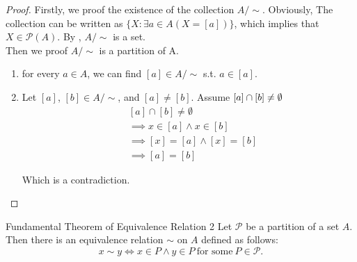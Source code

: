 \begin{proof}
    Firstly, we proof the existence of the collection $A/\sim$. Obviously, The collection can be written as $\{X: \exists a \in A (X = [a])\}$, which implies that $X \in \mathcal{P}(A) $. By , $A/\sim$ is a set.\\
    Then we proof $A/\sim$ is a partition of A.
    \begin{enumerate}

        \item for every $a \in A$, we can find $[a] \in A/\sim$ s.t. $a \in [a]$.
        \item Let $[a]$, $[b] \in A/\sim$, and  $[a] \neq [b]$. Assume $[a] \cap [b] \neq \emptyset\\$
        \begin{align*}
            &[a] \cap [b] \neq \emptyset \\
            &\implies x \in [a] \land x \in [b]\\
            &\implies [x] = [a] \land [x] = [b]\\
            &\implies [a] = [b] 
        \end{align*} 

        Which is a contradiction.

    \end{enumerate}
\end{proof}

\begin{theorem}{Fundamental Theorem of Equivalence Relation 2}{}
    Let $\mathcal{P}$ be a partition of a set $A$. Then there is an equivalence relation $\sim$ on $A$ defined as follows: 
    \begin{equation*}
        x \sim y \iff x \in P \land y \in P \ \text{for some}\ P \in \mathcal{P}.
    \end{equation*}
\end{theorem}

